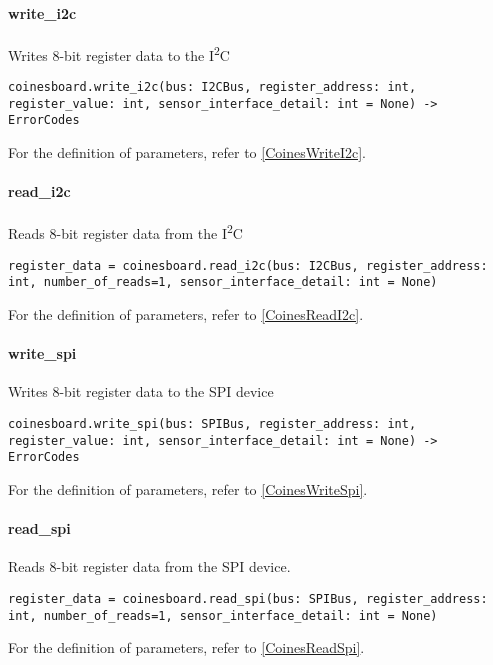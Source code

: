 \paragraph{write\_i2c}
Writes 8-bit register data to the I\textsuperscript{2}C

\begin{lstlisting}
coinesboard.write_i2c(bus: I2CBus, register_address: int, register_value: int, sensor_interface_detail: int = None) -> ErrorCodes
\end{lstlisting}

For the definition of parameters, refer to \ref{CoinesWriteI2c}.

\paragraph{read\_i2c}
Reads 8-bit register data from the I\textsuperscript{2}C

\begin{lstlisting}
register_data = coinesboard.read_i2c(bus: I2CBus, register_address: int, number_of_reads=1, sensor_interface_detail: int = None)
\end{lstlisting}

For the definition of parameters, refer to \ref{CoinesReadI2c}.

\paragraph{write\_spi}
Writes 8-bit register data to the SPI device

\begin{lstlisting}
coinesboard.write_spi(bus: SPIBus, register_address: int, register_value: int, sensor_interface_detail: int = None) -> ErrorCodes
\end{lstlisting}


For the definition of parameters, refer to \ref{CoinesWriteSpi}.

\paragraph{read\_spi}
Reads 8-bit register data from the SPI device.

\begin{lstlisting}
register_data = coinesboard.read_spi(bus: SPIBus, register_address: int, number_of_reads=1, sensor_interface_detail: int = None)
\end{lstlisting}

For the definition of parameters, refer to \ref{CoinesReadSpi}.

